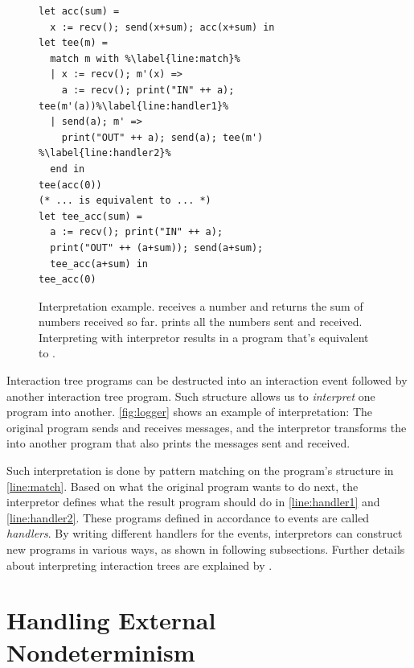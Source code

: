 \begin{figure}
  \begin{lstlisting}[style=customcoq,numbers=right,escapechar=\%]
let acc(sum) =
  x := recv(); send(x+sum); acc(x+sum) in
let tee(m) =
  match m with %\label{line:match}%
  | x := recv(); m'(x) =>
    a := recv(); print("IN" ++ a); tee(m'(a))%\label{line:handler1}%
  | send(a); m' =>
    print("OUT" ++ a); send(a); tee(m') %\label{line:handler2}%
  end in
tee(acc(0))
(* ... is equivalent to ... *)
let tee_acc(sum) =
  a := recv(); print("IN" ++ a);
  print("OUT" ++ (a+sum)); send(a+sum);
  tee_acc(a+sum) in
tee_acc(0)
  \end{lstlisting}
  \caption[Interpreting ITree programs.]{Interpretation example.   receives a number and returns the
    sum of numbers received so far.   prints all the numbers sent and
    received.  Interpreting  with interpretor  results in a
    program that's equivalent to .}
  \label{fig:logger}
\end{figure}

Interaction tree programs can be destructed into an interaction event followed
by another interaction tree program.  Such structure allows us to {\em
  interpret} one program into another.  \autoref{fig:logger} shows an example of
interpretation: The original  program sends and receives messages, and
the  interpretor transforms the  into another program that
also prints the messages sent and received.

Such interpretation is done by pattern matching on the program's structure in
\autoref{line:match}.  Based on what the original program wants to do next, the
interpretor defines what the result program should do in \autoref{line:handler1}
and \autoref{line:handler2}.  These programs defined in accordance to events are
called {\em handlers}.  By writing different handlers for the events,
interpretors can construct new programs in various ways, as shown in following
subsections.  Further details about interpreting interaction trees are explained
by \textcite{itree}.

\section{Handling External Nondeterminism}
\label{sec:external-nondet}
